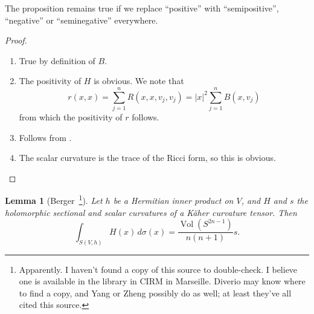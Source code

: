 \documentclass[10pt,a4paper]{article}
\newtheorem{lemm}[theo]{Lemma}
\newtheorem*{proof}{Proof}
\DeclareMathOperator{\Vol}{Vol}
\begin{document}
The proposition remains true if we replace ``positive'' with ``semipositive'', ``negative'' or ``seminegative'' everywhere.

\begin{proof}
  \begin{enumerate}
  \item True by definition of $B$.
  \item The positivity of $H$ is obvious. We note that
    $$
    r(x,x) = \sum_{j=1}^n R(x,x,v_j,v_j) = |x|^2 \sum_{j=1}^n B(x,v_j)
    $$
    from which the positivity of $r$ follows.
  \item Follows from .
  \item The scalar curvature is the trace of the Ricci form, so this is obvious.
  \end{enumerate}
\end{proof}


\begin{lemm}[Berger~\cite{berger1965varietes}\footnote{Apparently. I haven't found a copy of this source to double-check. I believe one is available in the library in CIRM in Marseille.  Diverio may know where to find a copy, and Yang or Zheng possibly do as well; at least they've all cited this source.}]
\label{lemm:holomorphic-sectional-to-scalar}
Let $h$ be a Hermitian inner product on $V$, and $H$ and $s$ the holomorphic sectional and scalar curvatures of a K\"aher curvature tensor. Then
$$
\int_{S(V,h)} H(x) \, d\sigma(x) = \frac{\Vol(S^{2n-1})}{n(n+1)} s.
$$
\end{lemm}
\end{document}
